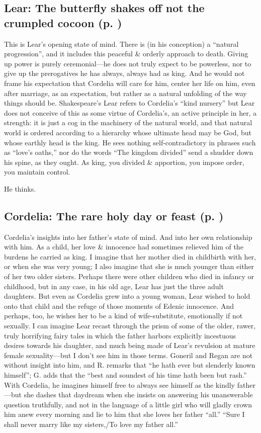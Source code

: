 \subsection{Lear: The butterfly shakes off not the crumpled cocoon (p. \pageref{ch:lear_aa})}
This is Lear's opening state of mind. There is (in his conception) a ``natural progression'', and it includes this peaceful \& orderly approach to death. Giving up power is purely ceremonial---he does not truly expect to be powerless, nor to give up the prerogatives he has always, always had as king. And he would not frame his expectation that Cordelia will care for him, center her life on him, even after marriage, as an expectation, but rather as a natural unfolding of the way things should be. Shakespeare's Lear refers to Cordelia's ``kind nursery'' but Lear does not conceive of this as some virtue of Cordelia's, an active principle in her, a strength: it is just a cog in the machinery of the natural world, and that natural world is ordered according to a hierarchy whose ultimate head may be God, but whose earthly head is the king. He sees nothing self-contradictory in phrases such as ``love's oaths,'' nor do the words ``The kingdom divided'' send a shudder down his spine, as they ought. As king, you divided \& apportion, you impose order, you maintain control.

He thinks.

\subsection{Cordelia: The rare holy day or feast (p. \pageref{ch:lear_ab})}
Cordelia's insights into her father's state of mind. And into her own relationship with him. As a child, her love \& innocence had sometimes relieved him of the burdens he carried as king. I imagine that her mother died in childbirth with her, or when she was very young; I also imagine that she is much younger than either of her two older sisters. Perhaps there were other children who died in infancy or childhood, but in any case, in his old age, Lear has just the three adult daughters. But even as Cordelia grew into a young woman, Lear wished to hold onto that child and the refuge of those moments of Edenic innocence. And perhaps, too, he wishes her to be a kind of wife-substitute, emotionally if not sexually. I can imagine Lear recast through the prism of some of the older, rawer, truly horrifying fairy tales in which the father harbors explicitly incestuous desires towards his daughter, and much being made of Lear's revulsion at mature female sexuality---but I don't see him in those terms. Goneril and Regan are not without insight into him, and R. remarks that ``he hath ever but slenderly known himself''; G. adds that the ``best and soundest of his time hath been but rash.'' With Cordelia, he imagines himself free to always see himself as the kindly father---but she dashes that daydream when she insists on answering his unanswerable question truthfully, and not in the language of a little girl who will gladly crown him anew every morning and lie to him that she loves her father ``all.'' ``Sure I shall never marry like my sisters,/To love my father all.''

